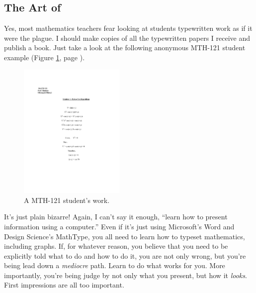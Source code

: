\documentclass[12pt,addpoints, answers, fleqn]{exam}
\begin{document}
\subsection{The Art of \LaTeXe}
Yes, most mathematics teachers fear looking at students typewritten work as if it were the plague. I should make copies of all the typewritten papers I receive and publish a book. Just take a look at the following anonymous MTH-121 student example (Figure \ref{fig:example3201}, page \pageref{fig:example3201}).
\begin{figure}[htbp] %
   \centering
   \includegraphics[width=2in]{./graphics/example3201.pdf} 
   \caption{A MTH-121 student's work.}
   \label{fig:example3201}
\end{figure}
It's just plain bizarre! Again, I can't say it enough, ``learn how to present information using a computer.'' Even if it's just using Microsoft's Word and Design Science's MathType, you all need to learn how to typeset mathematics, including graphs. If, for whatever reason, you believe that you need to be explicitly told what to do and how to do it, you are not only wrong, but you're being lead down a \emph{mediocre} path. Learn to do what works for you. More importantly, you're being judge by not only what you present, but how it \emph{looks}. First impressions are all too important.
\end{document}
